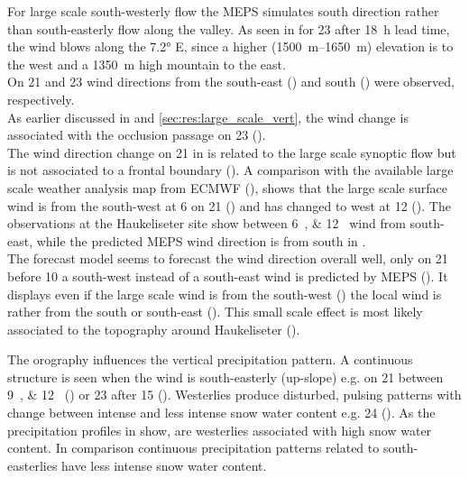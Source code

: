 For large scale south-westerly flow the MEPS simulates south direction rather than 
south-easterly flow along the valley. As seen in  for \SI{23}{\dec} after \SI{18}{\hour} lead time, the wind blows along the \ang{7.2} E, since a higher (\SIrange{1500}{1650}{\metre}) elevation is to the west and a \SI{1350}{\metre} high mountain to the east.
\\
On \num{21} and \SI{23}{\dec} wind directions from the south-east () and south () were observed, respectively.
\\
As earlier discussed in  and \ref{sec:res:large_scale_vert}, the wind change is associated with the occlusion passage on \SI{23}{\dec} ().
\\
The wind direction change on \SI{21}{\dec} in  is related to the large scale synoptic flow but is not associated to a frontal boundary (). A comparison with the available large scale weather analysis map from ECMWF (), shows that the large scale surface wind is from the south-west at \SI{6}{\UTC} on \SI{21}{\dec} () and has changed to west at \SI{12}{\UTC} (). The observations at the Haukeliseter site show between \SIlist{6;12}{\UTC} wind from south-east, while the predicted MEPS wind direction is from south in . 
\\
The forecast model seems to forecast the wind direction overall well, only on \SI{21}{\dec} before \SI{10}{\UTC} a south-west instead of a south-east wind is predicted by MEPS (). It displays even if the large scale wind is from the south-west () the local wind is rather from the south or south-east (). This small scale effect is most likely associated to the topography around Haukeliseter ().
\par\medskip\noindent
The orography influences the vertical precipitation pattern. A continuous structure is seen when the wind is south-easterly (up-slope) e.g. on \num{21} between \SIlist{9;12}{\UTC} () or \SI{23}{\dec} after \SI{15}{\UTC} (). Westerlies produce disturbed, pulsing patterns with change between intense and less intense snow water content e.g. \SI{24}{\dec} (). As the precipitation profiles in  show, are westerlies associated with high snow water content. In comparison continuous precipitation patterns related to south-easterlies have less intense snow water content.
